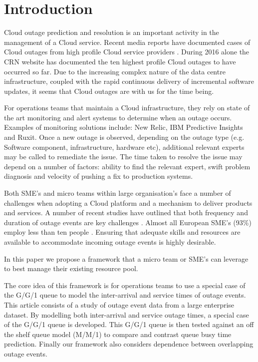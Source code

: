 \documentclass[5p]{elsarticle}
\begin{document}
\linenumbers

\section{Introduction}
Cloud outage prediction and resolution is an important activity in the management of a Cloud service. Recent media reports have documented cases of Cloud outages from high profile Cloud service providers \cite{CRN2016outage}. During 2016 alone the CRN website has documented the ten highest profile Cloud outages to have occurred so far.  Due to the increasing complex nature of the data centre infrastructure, coupled with the rapid continuous delivery of incremental software updates, it seems that Cloud outages are with us for the time being.

For operations teams that maintain a Cloud infrastructure, they rely on state of the art monitoring and alert systems to determine when an outage occurs. Examples of monitoring solutions include: New Relic, IBM Predictive Insights and Ruxit. Once a new outage is observed, depending on the outage type (e.g. Software component, infrastructure, hardware etc), additional relevant experts may be called to remediate the issue. The time taken to resolve the issue may depend on a number of factors: ability to find the relevant expert, swift problem diagnosis and velocity of pushing a fix to production systems. 

Both SME's and micro teams within large organisation's face a number of challenges when adopting a Cloud platform and a mechanism to deliver products and services. A number of recent studies have outlined that both frequency and duration of outage events are key challenges \cite{InfoWorld2015outage}. Almost all European SME's (93\%) employ less than ten people \cite{europa2015sme}. Ensuring that adequate skills and resources are available to accommodate incoming outage events is highly desirable.

In this paper we propose a framework that a micro team or SME's can leverage to best manage their existing resource pool. 

The core idea of this framework is for operations teams to use a special case of the G/G/1 queue to model the inter-arrival and service times of outage events. This article consists of a study of outage event data from a large enterprise dataset. By modelling both inter-arrival and service outage times, a special case of the G/G/1 queue is developed. This G/G/1 queue is then tested against an off the shelf queue model (M/M/1) to compare and contrast queue busy time prediction. Finally our framework also considers dependence between overlapping outage events. 
\end{document}
